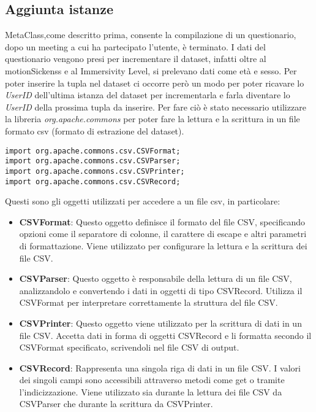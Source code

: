 \subsection{Aggiunta istanze}
\fancyhead{}    %
\label{paragrafo 5.2}

MetaClass,come descritto prima, consente la compilazione di un questionario, dopo un meeting a cui ha partecipato l'utente, è terminato.
I dati del questionario vengono presi per incrementare il dataset, infatti oltre al motionSickenss e al Immersivity Level, si prelevano dati come età e sesso.
Per poter inserire la tupla nel dataset ci occorre però un modo per poter ricavare lo \textit{UserID} dell'ultima istanza del dataset per incrementarla e farla diventare lo \textit{UserID} della prossima tupla da inserire.
Per fare ciò è stato necessario utilizzare la libreria \textit{org.apache.commons} per poter fare la lettura e la scrittura in un file formato csv (formato di estrazione del dataset). \\
\begin{lstlisting}
import org.apache.commons.csv.CSVFormat;
import org.apache.commons.csv.CSVParser;
import org.apache.commons.csv.CSVPrinter;
import org.apache.commons.csv.CSVRecord;
\end{lstlisting}
Questi sono gli oggetti utilizzati per accedere a un file csv, in particolare:
\par{
\begin{itemize}
    \item \textbf{CSVFormat}:
     Questo oggetto definisce il formato del file CSV, specificando opzioni come il separatore di colonne, il carattere di escape e altri parametri di formattazione. Viene utilizzato per configurare la lettura e la scrittura dei file CSV.
     \item \textbf{CSVParser}:
     Questo oggetto è responsabile della lettura di un file CSV, analizzandolo e convertendo i dati in oggetti di tipo CSVRecord. Utilizza il CSVFormat per interpretare correttamente la struttura del file CSV.
     \item \textbf{CSVPrinter}:
      Questo oggetto viene utilizzato per la scrittura di dati in un file CSV. Accetta dati in forma di oggetti CSVRecord e li formatta secondo il CSVFormat specificato, scrivendoli nel file CSV di output.
      \item \textbf{CSVRecord}:
      Rappresenta una singola riga di dati in un file CSV. I valori dei singoli campi sono accessibili attraverso metodi come get o tramite l'indicizzazione. Viene utilizzato sia durante la lettura dei file CSV da CSVParser che durante la scrittura da CSVPrinter.
\end{itemize}
}

